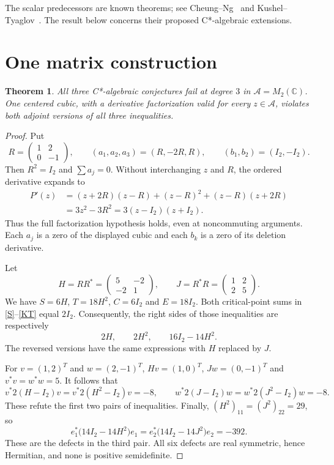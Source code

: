 \documentclass[11pt]{article}
\newtheorem{theorem}{Theorem}
\newcommand{\I}{I_2}
\begin{document}
The scalar predecessors are known theorems; see
Cheung--Ng~\cite{CN} and Kushel--Tyaglov~\cite{KT}.
The result below concerns their proposed C*-algebraic extensions.

\section{One matrix construction}
\begin{theorem}\label{main}
All three C*-algebraic conjectures fail at degree $3$ in
$\mathcal A=M_2(\mathbb C)$. One centered cubic, with a derivative
factorization valid for every $z\in\mathcal A$, violates both adjoint
versions of all three inequalities.
\end{theorem}
\begin{proof}
Put
\[
 R=\begin{pmatrix}1&2\\0&-1\end{pmatrix},\qquad
 (a_1,a_2,a_3)=(R,-2R,R),\qquad (b_1,b_2)=(\I,-\I).
\]
Then $R^2=\I$ and $\sum a_j=0$. Without interchanging $z$ and $R$,
the ordered derivative expands to
\begin{align*}
 P'(z)&=(z+2R)(z-R)+(z-R)^2+(z-R)(z+2R)\\
      &=3z^2-3R^2=3(z-\I)(z+\I).
\end{align*}
Thus the full factorization hypothesis holds, even at noncommuting
arguments. Each $a_j$ is a zero of the displayed cubic and each $b_k$
is a zero of its deletion derivative.

Let
\[
 H=RR^*=\begin{pmatrix}5&-2\\-2&1\end{pmatrix},\qquad
 J=R^*R=\begin{pmatrix}1&2\\2&5\end{pmatrix}.
\]
We have $S=6H$, $T=18H^2$, $C=6\I$ and $E=18\I$.
Both critical-point sums in \eqref{S}--\eqref{KT} equal $2\I$.
Consequently, the right sides of those inequalities are respectively
\[
 2H,\qquad 2H^2,\qquad 16\I-14H^2.
\]
The reversed versions have the same expressions with $H$ replaced by $J$.

For $v=(1,2)^T$ and $w=(2,-1)^T$,
$Hv=(1,0)^T$, $Jw=(0,-1)^T$ and $v^*v=w^*w=5$.
It follows that
\[
 v^*2(H-\I)v=v^*2(H^2-\I)v=-8,
 \qquad
 w^*2(J-\I)w=w^*2(J^2-\I)w=-8.
\]
These refute the first two pairs of inequalities. Finally,
$ (H^2)_{11}=(J^2)_{22}=29 $, so
\[
 e_1^*\bigl(14\I-14H^2\bigr)e_1
 =e_2^*\bigl(14\I-14J^2\bigr)e_2=-392.
\]
These are the defects in the third pair. All six defects are
real symmetric, hence Hermitian, and none is positive semidefinite.
\end{proof}
\end{document}
